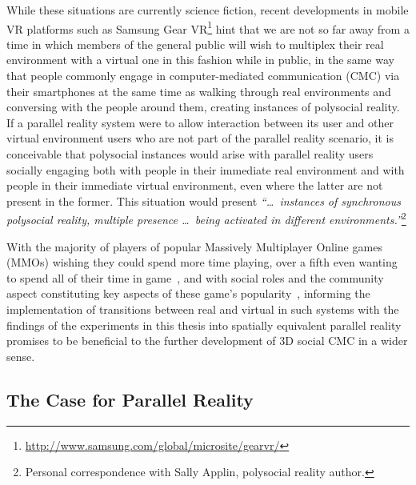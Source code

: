 While these situations are currently science fiction, recent developments in mobile VR platforms such as Samsung Gear VR\footnote{\url{http://www.samsung.com/global/microsite/gearvr/}} hint that we are not so far away from a time in which members of the general public will wish to multiplex their real environment with a virtual one in this fashion while in public, in the same way that people commonly engage in computer-mediated communication (CMC) via their smartphones at the same time as walking through real environments and conversing with the people around them, creating instances of polysocial reality. If a parallel reality system were to allow interaction between its user and other virtual environment users who are not part of the parallel reality scenario, it is conceivable that polysocial instances would arise with parallel reality users socially engaging both with people in their immediate real environment and with people in their immediate virtual environment, even where the latter are not present in the former. This situation would present \textit{``\ldots\ instances of synchronous polysocial reality, multiple presence \ldots\ being activated in different environments.''}\footnote{Personal correspondence with Sally Applin, polysocial reality author.}

With the majority of players of popular Massively Multiplayer Online games (MMOs) wishing they could spend more time playing, over a fifth even wanting to spend all of their time in game~\cite{Castronova2006}, and with social roles and the community aspect constituting key aspects of these game's popularity~\cite{Castronova2006, Bartle2004}, informing the implementation of transitions between real and virtual in such systems with the findings of the experiments in this thesis into spatially equivalent parallel reality promises to be beneficial to the further development of 3D social CMC in a wider sense.


\subsection{The Case for Parallel Reality}
\label{caseforpr}

